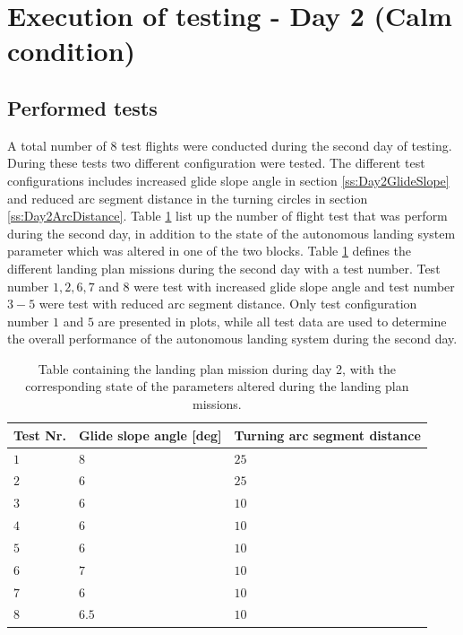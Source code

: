 \section{Execution of testing - Day 2 (Calm condition)}
\subsection{Performed tests}
A total number of 8 test flights were conducted during the second day of testing. During these tests two different configuration were tested. The different test configurations includes increased glide slope angle in section \ref{ss:Day2GlideSlope} and reduced arc segment distance in the turning circles in section \ref{ss:Day2ArcDistance}. Table \ref{tb:Day2ParameterAlteration} list up the number of flight test that was perform during the second day, in addition to the state of the autonomous landing system parameter which was altered in one of the two blocks. Table \ref{tb:Day2ParameterAlteration} defines the different landing plan missions during the second day with a test number. Test number $1,2,6,7$ and $8$ were test with increased glide slope angle and test number $3-5$ were test with reduced arc segment distance. Only test configuration number $1$ and $5$ are presented in plots, while all test data are used to determine the overall performance of the autonomous landing system during the second day.
\begin{table}[H]
\begin{tabular}{| p{0.5cm} | p{3cm} | p{4cm} |}
\hline
\textbf{Test Nr.} & \textbf{Glide slope angle [deg]} &  \textbf{Turning arc segment distance}\\ \hline
$1$				& $8$ & $ 25 $		\\ \hline
$2$				& $6$ & $ 25 $		\\ \hline
$3$				& $6$ & $ 10 $		\\ \hline
$4$				& $6$ & $ 10 $		\\ \hline
$5$				& $6$ & $ 10 $			\\ \hline
$6$				& $7$ & $ 10 $		\\ \hline
$7$				& $6$ & $ 10 $			\\ \hline
$8$				& $6.5$ & $ 10 $	\\ \hline
\end{tabular}
\caption{Table containing the landing plan mission during day 2, with the corresponding state of the parameters altered during the landing plan missions.}
\label{tb:Day2ParameterAlteration}
\end{table}

